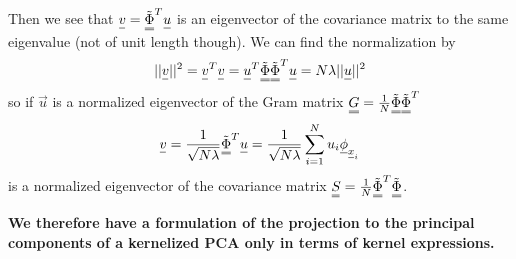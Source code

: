 Then we see that $\vec{v} = \mat{\tilde{\Phi}}^T \vec{u}$ is an eigenvector of the covariance matrix to the same eigenvalue
(not of unit length though). We can find the normalization by
\begin{equation}
    ||\vec{v}||^2 = \vec{v}^T \vec{v} = \vec{u}^T \mat{\tilde{\Phi}} \mat{\tilde{\Phi}}^T \vec{u} = N \lambda ||\vec{u}||^2
\end{equation}
so if $\vec{u}$ is a normalized eigenvector of the Gram matrix $\mat{G} = \frac{1}{N} \mat{\tilde{\Phi}} \mat{\tilde{\Phi}}^T$
\begin{equation}
    \vec{v} = \frac{1}{\sqrt{N \lambda}} \mat{\tilde{\Phi}}^T \vec{u} = \frac{1}{\sqrt{N \lambda}} \sum_{i = 1}^{N} u_i \vec{\phi}_{\vec{x}_i}
\end{equation}
is a normalized eigenvector of the covariance matrix $\mat{S} = \frac{1}{N} \mat{\tilde{\Phi}}^T \mat{\tilde{\Phi}}$.


\textbf{We therefore have a formulation of the projection to the principal components of a kernelized PCA only in terms of kernel expressions.}

